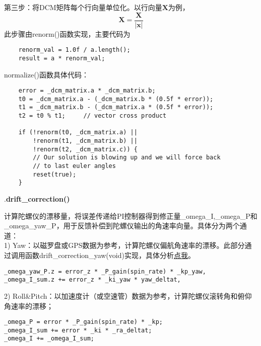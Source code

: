 \documentclass[a4paper,10pt]{ctexart} %
\begin{document}
第三步：将DCM矩阵每个行向量单位化。以行向量$\mathbf{X}$为例，
\begin{equation}
\mathbf{X}=\frac{\mathbf{X}}{|\mathbf{x}|}
\end{equation}
此步骤由renorm()函数实现，主要代码为
\begin{lstlisting}
    renorm_val = 1.0f / a.length();
    result = a * renorm_val;    
\end{lstlisting}

\vspace{8pt}
\noindent normalize()函数具体代码：
\begin{lstlisting}
    error = _dcm_matrix.a * _dcm_matrix.b;
    t0 = _dcm_matrix.a - (_dcm_matrix.b * (0.5f * error));
    t1 = _dcm_matrix.b - (_dcm_matrix.a * (0.5f * error));
    t2 = t0 % t1;     // vector cross product

    if (!renorm(t0, _dcm_matrix.a) ||
        !renorm(t1, _dcm_matrix.b) ||
        !renorm(t2, _dcm_matrix.c)) {
        // Our solution is blowing up and we will force back
        // to last euler angles
        reset(true);
    }
\end{lstlisting}

\vspace{10pt}

.\textbf{drift\_correction()}

计算陀螺仪的漂移量，将误差传递给PI控制器得到修正量\_omega\_I,\_omega\_P和\_omega\_yaw\_P，用于反馈补偿到陀螺仪输出的角速率向量。具体分为两个通道：\\
1) Yaw：以磁罗盘或GPS数据为参考，计算陀螺仪偏航角速率的漂移。此部分通过调用函数drift\_correction\_yaw(void)实现，具体分析\hyperref[drift_correction_yaw]{点我}。		\label{drift_correction} %
\begin{verbatim}
_omega_yaw_P.z = error_z * _P_gain(spin_rate) * _kp_yaw,
_omega_I_sum.z += error_z * _ki_yaw * yaw_deltat,
\end{verbatim}
2) Roll\&Pitch：以加速度计（或空速管）数据为参考，计算陀螺仪滚转角和俯仰角速率的漂移；
\begin{verbatim}
_omega_P = error * _P_gain(spin_rate) * _kp;
_omega_I_sum += error * _ki * _ra_deltat;
_omega_I += _omega_I_sum;
\end{verbatim}

\end{document}
